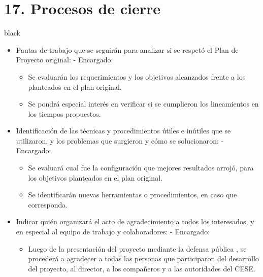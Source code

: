 \documentclass[11pt]{charter}
\begin{document}
\section{17. Procesos de cierre}    
\label{sec:cierre}
\begin{consigna}{black}
\begin{itemize}
\item Pautas de trabajo que se seguirán para analizar si se respetó el Plan de Proyecto original:
 - Encargado: \authorname
 \begin{itemize}
 \item Se evaluarán los requerimientos y los objetivos alcanzados frente a los planteados en el plan original.
\item Se pondrá especial interés en verificar  si se cumplieron los lineamientos en los tiempos propuestos.
  \end{itemize}
  
\item Identificación de las técnicas y procedimientos útiles e inútiles que se utilizaron, y los problemas que surgieron y cómo se solucionaron:
 - Encargado: \authorname
 \begin{itemize}
 \item Se evaluará cual fue la configuración que mejores resultados arrojó, para los objetivos planteados en el plan original.
\item Se identificarán nuevas herramientas o procedimientos, en caso que corresponda.
  \end{itemize}
   
\item Indicar quién organizará el acto de agradecimiento a todos los interesados, y en especial al equipo de trabajo y colaboradores:
 - Encargado: \authorname
 \begin{itemize}
 \item Luego de la presentación del proyecto mediante la defensa pública , se procederá a
agradecer a todas las personas que participaron del desarrollo del proyecto, al director, a los compañeros y a las autoridades del CESE.

  \end{itemize}


\end{itemize}
\end{consigna}
\end{document}
